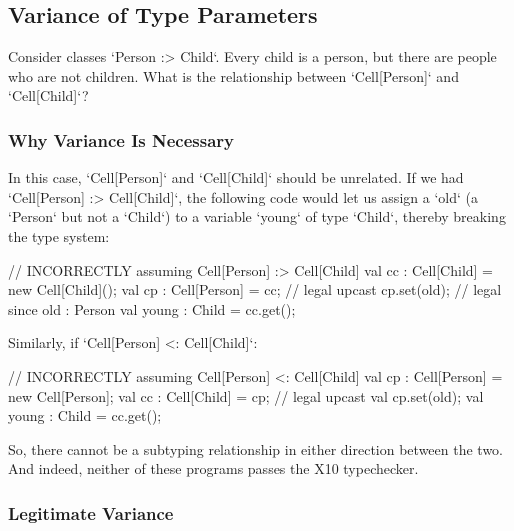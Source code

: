 \subsection{Variance of Type Parameters}

% 
% 
% 
% 
% 
% 
% 

Consider classes \xcd`Person :> Child`.  Every child is a person, but there
are people who are not children.  What is the relationship between
\xcd`Cell[Person]` and \xcd`Cell[Child]`?  

\subsubsection{Why Variance Is Necessary}

In this case, \xcd`Cell[Person]` and \xcd`Cell[Child]` should be unrelated.  
If we had \xcd`Cell[Person] :> Cell[Child]`, the following code would let us
assign a \xcd`old` (a \xcd`Person` but not a \xcd`Child`) to a
variable \xcd`young` of type \xcd`Child`, thereby breaking the type system: 
\begin{xten}
// INCORRECTLY assuming Cell[Person] :> Cell[Child]
val cc : Cell[Child] = new Cell[Child]();
val cp : Cell[Person] = cc; // legal upcast
cp.set(old);       // legal since old : Person
val young : Child = cc.get(); 
\end{xten}

Similarly, if \xcd`Cell[Person] <: Cell[Child]`: 
\begin{xten}
// INCORRECTLY assuming Cell[Person] <: Cell[Child]
val cp : Cell[Person] = new Cell[Person];
val cc : Cell[Child] = cp; // legal upcast
val cp.set(old); 
val young : Child = cc.get();
\end{xten}

So, there cannot be a subtyping relationship in either direction between the
two. And indeed, neither of these programs passes the X10 typechecker.


\subsubsection{Legitimate Variance}


